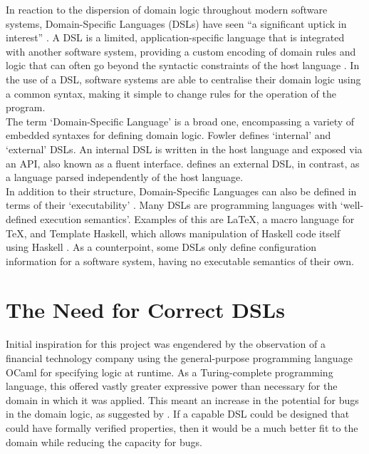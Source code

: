 \documentclass[a4paper,11pt]{report}
\begin{document}
In reaction to the dispersion of domain logic throughout modern software systems, Domain-Specific Languages (DSLs) have seen ``a significant uptick in interest'' \citep{fowler2010domain}. 
A DSL is a limited, application-specific language that is integrated with another software system, providing a custom encoding of domain rules and logic that can often go beyond the syntactic constraints of the host language \citep{Mernik:2005:DDL:1118890.1118892}.
In the use of a DSL, software systems are able to centralise their domain logic using a common syntax, making it simple to change rules for the operation of the program.\\

The term `Domain-Specific Language' is a broad one, encompassing a variety of embedded syntaxes for defining domain logic.
Fowler defines `internal' and `external' DSLs.
An internal DSL is written in the host language and exposed via an API, also known as a fluent interface.
\cite{fowler2010domain} defines an external DSL, in contrast, as a language parsed independently of the host language.\\

In addition to their structure, Domain-Specific Languages can also be defined in terms of their `executability' \citep{Mernik:2005:DDL:1118890.1118892}.
Many DSLs are programming languages with `well-defined execution semantics'.
Examples of this are \LaTeX, a macro language for \TeX, and Template Haskell, which allows manipulation of Haskell code itself using Haskell \citep{sheard2002template}.
As a counterpoint, some DSLs only define configuration information for a software system, having no executable semantics of their own.


\section{The Need for Correct DSLs} %
\label{sec:the_need_for_correct_dsls}
Initial inspiration for this project was engendered by the observation of a financial technology company using the general-purpose programming language OCaml for specifying logic at runtime.
As a Turing-complete programming language, this offered vastly greater expressive power than necessary for the domain in which it was applied.
This meant an increase in the potential for bugs in the domain logic, as suggested by \cite{subramanyam2003empirical}.
If a capable DSL could be designed that could have formally verified properties, then it would be a much better fit to the domain while reducing the capacity for bugs.\\
\end{document}
